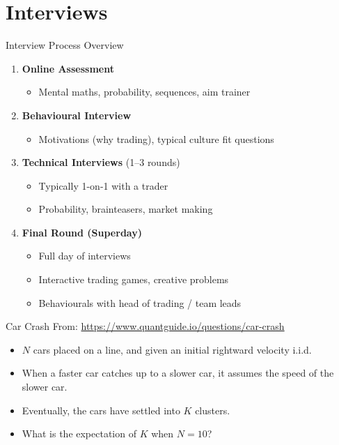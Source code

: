 \section{Interviews}

\begin{frame}{Interview Process Overview}
  \begin{enumerate}
    \item \textbf{Online Assessment}
    \begin{itemize}
      \item Mental maths, probability, sequences, aim trainer
    \end{itemize}
    \item \textbf{Behavioural Interview}
    \begin{itemize}
      \item Motivations (why trading), typical culture fit questions
    \end{itemize}
    \item \textbf{Technical Interviews} (1--3 rounds)
    \begin{itemize}
      \item Typically 1-on-1 with a trader
      \item Probability, brainteasers, market making
    \end{itemize}
    \item \textbf{Final Round (Superday)}
    \begin{itemize}
      \item Full day of interviews
      \item Interactive trading games, creative problems
      \item Behaviourals with head of trading / team leads
    \end{itemize}
  \end{enumerate}
\end{frame}

\begin{frame}{Car Crash}
  From: \href{https://www.quantguide.io/questions/car-crash}{https://www.quantguide.io/questions/car-crash}

  \begin{sqt:tip}
    \begin{itemize}
      \item $N$ cars placed on a line, and given an initial rightward velocity i.i.d.
      \item When a faster car catches up to a slower car, it assumes the speed of the slower car.
      \item Eventually, the cars have settled into $K$ clusters.
      \item What is the expectation of $K$ when $N=10$?
    \end{itemize}
  \end{sqt:tip}
\end{frame}

